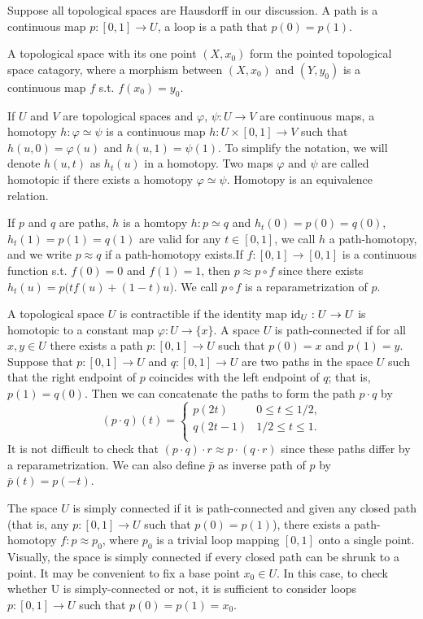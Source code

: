 \documentclass[10pt]{article}
\theoremstyle{plain}
\begin{document}
Suppose all topological spaces are Hausdorff in our discussion. A path is a continuous map $p:[0,1]\to U$, a loop is a path that $p(0)=p(1)$.

A topological space with its one point $(X,x_0)$ form the pointed topological space catagory, where a morphism between $(X,x_0)$ and $(Y,y_0)$ is a continuous map $f$ s.t. $f(x_0)=y_0$.

If $U$ and $V$ are topological spaces and $\varphi$, $\psi:U\to V$ are continuous maps, a homotopy $h : \varphi \simeq\psi$ is a continuous map $h : U × [0,1] \to V$ such that $h(u,0) = \varphi(u)$ and $h(u,1) = \psi(1)$. To simplify the notation, we will denote
$h(u, t)$ as $h_t(u)$ in a homotopy. Two maps $\varphi$ and $\psi$ are called homotopic if there exists a homotopy $\varphi \simeq\psi$. Homotopy is an equivalence relation.

If $p$ and $q$ are paths, $h$ is a homtopy $h: p \simeq q$ and $h_t(0)=p(0)=q(0)$, $h_t(1)=p(1)=q(1)$ are valid for any $t\in[0,1]$, we call $h$ a path-homotopy, and we write $p \approx q$ if a path-homotopy exists.If $f:[0,1]\to[0,1]$ is a continuous function s.t. $f(0)=0$ and $f(1)=1$, then $p\approx p\circ f$ since there exists $h_t(u)=p\bigl(tf(u)+(1-t)u\bigr)$. We call $p\circ f$ is a reparametrization of $p$.

A topological space $U$ is contractible if the identity map $\operatorname{id}_U:U\to U$ is homotopic to a constant map $\varphi:U\to \{x\}$. A space
$U$ is path-connected if for all $x, y \in U$ there exists a path $p : [0,1] \to U$ such that $p(0) = x$ and $p(1) = y$.
Suppose that $p : [0,1] \to U$ and $q : [0,1] \to U$ are two paths in the space $U$ such that the right endpoint of $p$ coincides with the left endpoint of $q$; that is, $p(1) = q(0)$. Then we can concatenate the paths to form the path $p\cdot q$ by
\[
	(p\cdot q)(t)=
	\begin{cases}
		p(2t) &0 \leq t\leq 1/2,\\
		q(2t-1)&1/2 \leq t\leq 1.\\
	\end{cases}
\]
It is not difficult to check that $(p\cdot q)\cdot r \approx p\cdot (q\cdot r)$ since these paths differ by a reparametrization. We can also define $\bar{p}$ as inverse path of $p$ by $\bar{p}(t)=p(-t)$.

The space $U$ is simply connected if it is path-connected and given any
closed path (that is, any $p : [0,1] \to U$ such that $p(0) = p(1)$), there exists a path-homotopy $f : p \approx p_0$, where $p_0$ is a trivial loop mapping $[0,1]$ onto a single point. Visually, the space is simply connected if every closed path can be shrunk to a point. It may be convenient to fix a base point $x_0 \in U$. In this case, to check whether U is simply-connected or not, it is sufficient to consider
loops $p : [0,1] \to U$ such that $p(0) = p(1) = x_0$.
\end{document}

